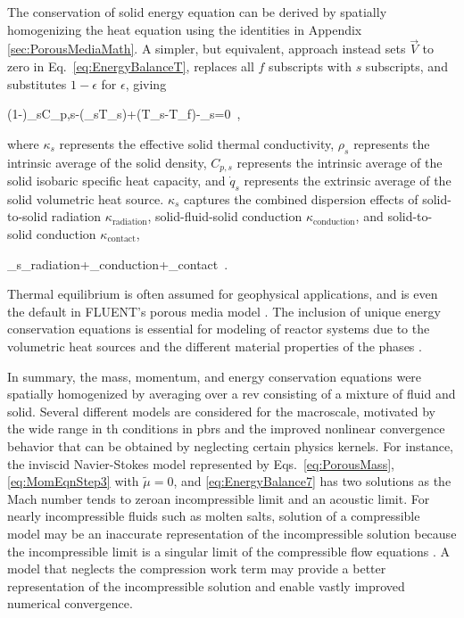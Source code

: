 The conservation of solid energy equation can be derived by spatially homogenizing the heat equation using the identities in Appendix \ref{sec:PorousMediaMath}. A simpler, but equivalent, approach instead sets \(\vec{V}\) to zero in Eq.\ \eqref{eq:EnergyBalanceT}, replaces all \(f\) subscripts with \(s\) subscripts, and substitutes \(1-\epsilon\) for \(\epsilon\), giving

\beq
\label{eq:SolidPorous}
(1-\epsilon)\rho_sC_{p,s}-\nabla\cdot(\kappa_s\nabla T_s)+\alpha(T_s-T_f)-_s=0\ ,
\eeq

\noindent where \(\kappa_s\) represents the effective solid thermal conductivity, \(\rho_s\) represents the intrinsic average of the solid density, \(C_{p,s}\) represents the intrinsic average of the solid isobaric specific heat capacity, and \(\dot{q}_s\) represents the extrinsic average of the solid volumetric heat source. \(\kappa_s\) captures the combined dispersion effects of solid-to-solid radiation \(\kappa_\text{radiation}\), solid-fluid-solid conduction \(\kappa_\text{conduction}\), and solid-to-solid conduction \(\kappa_\text{contact}\),

\beq
\label{eq:Kappa}
\kappa_s\equiv\kappa_{\textrm{radiation}}+\kappa_{\textrm{conduction}}+\kappa_{\textrm{contact}}\ .
\eeq

\noindent Thermal equilibrium is often assumed for geophysical applications, and is even the default in FLUENT's porous media model \cite{fluent}. The inclusion of unique energy conservation equations is essential for modeling of reactor systems due to the volumetric heat sources and the different material properties of the phases \cite{becker,novak_sana}.

In summary, the mass, momentum, and energy conservation equations were spatially homogenized by averaging over a \gls{rev} consisting of a mixture of fluid and solid. Several different models are considered for the macroscale, motivated by the wide range in \gls{th} conditions in \glspl{pbr} and the improved nonlinear convergence behavior that can be obtained by neglecting certain physics kernels. For instance, the inviscid Navier-Stokes model represented by Eqs.\ \eqref{eq:PorousMass}, \eqref{eq:MomEqnStep3} with \(\tilde{\mu}=0\), and \eqref{eq:EnergyBalance7} has two solutions as the Mach number tends to zero\mdash an incompressible limit and an acoustic limit. For nearly incompressible fluids such as molten salts, solution of a compressible model may be an inaccurate representation of the incompressible solution because the incompressible limit is a singular limit of the compressible flow equations \cite{guillard}. A model that neglects the compression work term may provide a better representation of the incompressible solution and enable vastly improved numerical convergence.

